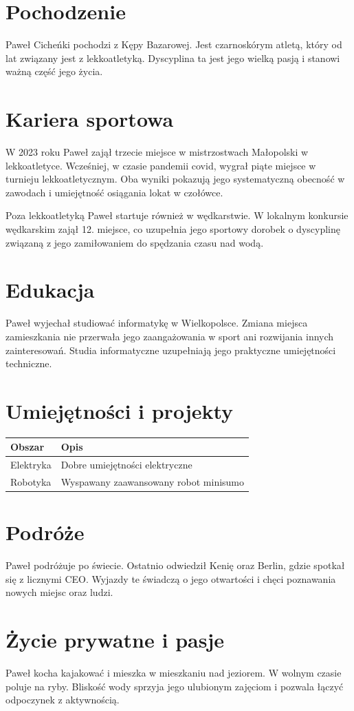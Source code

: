 \section*{Pochodzenie}
Paweł Cicheńki pochodzi z Kępy Bazarowej. Jest czarnoskórym atletą, który od lat związany jest z lekkoatletyką. Dyscyplina ta jest jego wielką pasją i stanowi ważną część jego życia.

\section*{Kariera sportowa}
W 2023 roku Paweł zajął trzecie miejsce w mistrzostwach Małopolski w lekkoatletyce. Wcześniej, w czasie pandemii covid, wygrał piąte miejsce w turnieju lekkoatletycznym. Oba wyniki pokazują jego systematyczną obecność w zawodach i umiejętność osiągania lokat w czołówce.

Poza lekkoatletyką Paweł startuje również w wędkarstwie. W lokalnym konkursie wędkarskim zajął 12. miejsce, co uzupełnia jego sportowy dorobek o dyscyplinę związaną z jego zamiłowaniem do spędzania czasu nad wodą.

\section*{Edukacja}
Paweł wyjechał studiować informatykę w Wielkopolsce. Zmiana miejsca zamieszkania nie przerwała jego zaangażowania w sport ani rozwijania innych zainteresowań. Studia informatyczne uzupełniają jego praktyczne umiejętności techniczne.

\section*{Umiejętności i projekty}
\begin{tabularx}{\textwidth}{@{}lX@{}}
\toprule
\textbf{Obszar} & \textbf{Opis} \\
\midrule
Elektryka & Dobre umiejętności elektryczne \\
Robotyka & Wyspawany zaawansowany robot minisumo \\
\bottomrule
\end{tabularx}

\vspace{0.4cm}

\section*{Podróże}
Paweł podróżuje po świecie. Ostatnio odwiedził Kenię oraz Berlin, gdzie spotkał się z licznymi CEO. Wyjazdy te świadczą o jego otwartości i chęci poznawania nowych miejsc oraz ludzi.

\section*{Życie prywatne i pasje}
Paweł kocha kajakować i mieszka w mieszkaniu nad jeziorem. W wolnym czasie poluje na ryby. Bliskość wody sprzyja jego ulubionym zajęciom i pozwala łączyć odpoczynek z aktywnością.